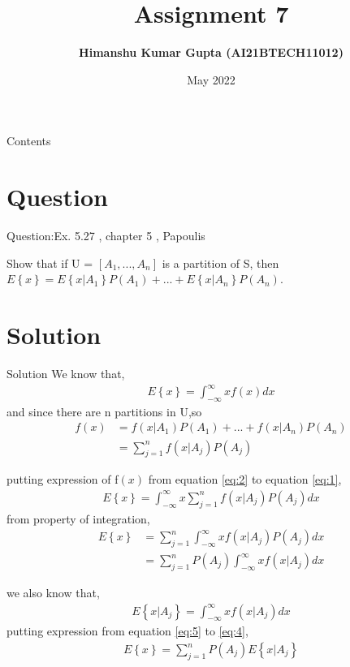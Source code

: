 \documentclass[journal,12pt,twocolumn]{beamer}
\title{Assignment 7}
\author{\textbf{Himanshu Kumar Gupta (AI21BTECH11012)}}
\date {May 2022}
\providecommand{\brak}[1]{\ensuremath{\left(#1\right)}}
\providecommand{\cbrak}[1]{\ensuremath{\left\{#1\right\}}}
\begin{document}
\begin{frame}
 \maketitle   
\end{frame}

\begin{frame}{Contents}
    \tableofcontents
\end{frame}

\section{Question}
\begin{frame}{Question:Ex. 5.27 , chapter 5 , Papoulis}
\begin{block}

Show that if U = $[A_1,...,A_n]$ is a partition of S, then 
$E\cbrak{x} = E\cbrak{x|A_1}P\brak{A_1} +...+ E\cbrak{x| A_n}P\brak{A_n}$.

\end{block}
\end{frame}

\section{Solution}
\begin{frame}{Solution}
We know that,
\begin{align}
\label{eq:1}
E\cbrak{x}= \int_{-\infty}^{\infty} x f\brak{x} dx
\end{align}
and since there are n partitions in U,so
\begin{align}
\label{eq:2}
f\brak{x} &=f\brak{x| A_1}P\brak{A_1} + ... + f\brak{x | A_n}P\brak{A_n}   \nonumber   \\
&=\sum\limits_{j=1}^n f\brak{x | A_j}P\brak{A_j}
\end{align}
\end{frame}

\begin{frame}
putting expression of f\brak{x} from equation \eqref{eq:2} to equation \eqref{eq:1},
\begin{align}
\label{eq:3}
E\cbrak{x}= \int_{-\infty}^{\infty} x \sum\limits_{j=1}^n f\brak{x | A_j}P\brak{A_j}dx
\end{align}
from property of integration,
\begin{align}
\label{eq:4}
    E\cbrak{x}&=\sum\limits_{j=1}^n \int_{-\infty}^{\infty} x f\brak{x | A_j}P\brak{A_j}dx   \nonumber\\
    &=\sum\limits_{j=1}^n P\brak{A_j} \int_{-\infty}^{\infty} x f\brak{x | A_j}dx
\end{align}
\end{frame}

\begin{frame}
we also know that,
\begin{align}
\label{eq:5}
    E\cbrak{x|A_j}=\int_{-\infty}^{\infty} x f\brak{x | A_j}dx
\end{align}
putting expression from equation \eqref{eq:5} to \eqref{eq:4},
\begin{align}
    E\cbrak{x} =\sum\limits_{j=1}^n P\brak{A_j} E\cbrak{x|A_j}
\end{align}
\end{frame}
\end{document}
